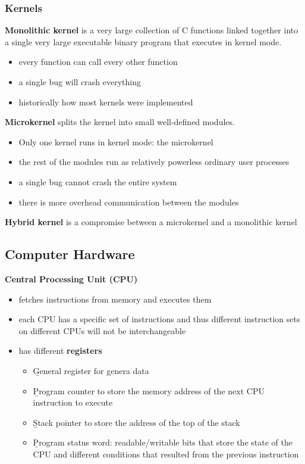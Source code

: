 \documentclass{article}
\begin{document}
    \subsubsection{Kernels}

    \textbf{Monolithic kernel} is a very large collection of C functions linked together into a single very large executable binary program that executes in kernel mode.

    \begin{itemize}
    \item every function can call every other function
    \item a single bug will crash everything
    \item historically how most kernels were implemented
    \end{itemize}

    \noindent \textbf{Microkernel} splits the kernel into small well-defined modules. 


    \begin{itemize}
    \item Only one kernel runs in kernel mode: the microkernel
    \item the rest of the modules run as relatively powerless ordinary user processes
    \item a single bug cannot crash the entire system
    \item there is more overhead communication between the modules
    \end{itemize}

    \noindent \textbf{Hybrid kernel} is a compromise between a microkernel and a monolithic kernel

\subsection{Computer Hardware}

    \textbf{Central Processing Unit (CPU)}

    \begin{itemize}
    \item fetches instructions from memory and executes them
    \item each CPU has a specific set of instructions and thus different instruction sets on different CPUs will not be interchangeable
    \item has different \textbf{registers}
    \begin{itemize}
        \item \b{General} register for genera data
        \item \b{Program} counter to store the memory address of the next CPU instruction to execute
        \item \b{Stack pointer} to store the address of the top of the stack
        \item \b{Program status word}: readable/writable bits that store the state of the CPU and different conditions that resulted from the previous instruction
    \end{itemize}
    \end{itemize}
\end{document}
